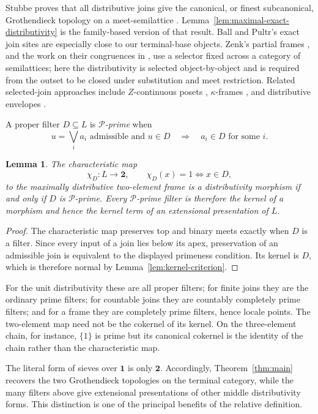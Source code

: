 \documentclass[12pt,oneside,reqno]{amsart}
\newtheorem{lemma}[theorem]{Lemma}
\theoremstyle{definition}
\theoremstyle{remark}
\begin{document}
Stubbe proves that all distributive joins give the canonical, or
finest subcanonical, Grothendieck topology on a meet-semilattice
\cite{Stubbe}.  Lemma~\ref{lem:maximal-exact-distributivity} is the
family-based version of that result.  Ball and Pultr's exact join sites
\cite{BallPultr} are especially close to our terminal-base objects.
Zenk's partial frames \cite{Zenk}, and the work on their congruences in
\cite{FrithSchauerteMadden,SchauerteFrith}, use a selector fixed across
a category of semilattices; here the distributivity is selected
object-by-object and is required from the outset to be closed under
substitution and meet restriction.  Related selected-join approaches
include \(Z\)-continuous posets \cite{BandeltErne}, \(\kappa\)-frames
\cite{Madden}, and distributive envelopes
\cite{GehrkeVanGool}.

A proper filter \(D\subseteq L\) is \emph{\(\mathcal P\)-prime} when
\[
 u=\bigvee_i a_i\text{ admissible and }u\in D
 \quad\Longrightarrow\quad
 a_i\in D\text{ for some }i.
\]

\begin{lemma}\label{lem:prime-points}
The characteristic map
\[
 \chi_D:L\longrightarrow\mathbf2,
 \qquad
 \chi_D(x)=1\Longleftrightarrow x\in D,
\]
to the maximally distributive two-element frame is a distributivity
morphism if and only if \(D\) is \(\mathcal P\)-prime.  Every
\(\mathcal P\)-prime filter is therefore the kernel of a morphism and
hence the kernel term of an extensional presentation of \(L\).
\end{lemma}

\begin{proof}
The characteristic map preserves top and binary meets exactly when
\(D\) is a filter.  Since every input of a join lies below its apex,
preservation of an admissible join is equivalent to the displayed
primeness condition.  Its kernel is \(D\), which is therefore normal
by Lemma~\ref{lem:kernel-criterion}.
\end{proof}

For the unit distributivity these are all proper filters; for finite
joins they are the ordinary prime filters; for countable joins they are
countably completely prime filters; and for a frame they are completely
prime filters, hence locale points.  The two-element map need not be the
cokernel of its kernel.  On the three-element chain, for instance,
\(\{1\}\) is prime but its canonical cokernel is the identity of the
chain rather than the characteristic map.

The literal form of sieves over \(\mathbf1\) is only \(\mathbf2\).
Accordingly, Theorem~\ref{thm:main} recovers the two Grothendieck
topologies on the terminal category, while the many filters above give
extensional presentations of other middle distributivity forms.  This
distinction is one of the principal benefits of the relative
definition.
\end{document}
